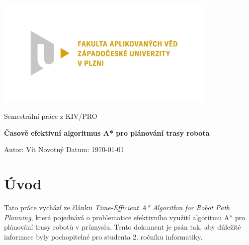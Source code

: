 \documentclass[10pt, a4paper]{article}
\begin{document}
\begin{titlepage}
    \includegraphics[width=0.80\textwidth]{images/fav.pdf}
    \begin{center}
        \vspace{2cm}

        \LARGE
        Semestrální práce z KIV/PRO

        \Huge
        \textbf{Časově efektivní algoritmus A* pro plánování trasy robota}

        \vspace{1cm}

        \vfill

        \vspace{0.5cm}

        \normalsize
        \raggedright
        Autor: Vít Novotný \hfill Datum: \today

        \vspace{0.2cm}

    \end{center}
\end{titlepage}

\thispagestyle{empty}
\pagebreak

\setcounter{page}{2}
\renewcommand{\cftsecleader}{\cftdotfill{\cftdotsep}}
\renewcommand{\cftsubsecleader}{\cftdotfill{\cftdotsep}}
\renewcommand{\cftsubsubsecleader}{\cftdotfill{\cftdotsep}}

\tableofcontents
\pagebreak


\section{Úvod}
Tato práce vychází ze článku \textit{Time-Efficient A* Algorithm for Robot Path Planning}\cite{MainWork}, která pojednává o problematice efektivního využití algoritmu A* pro plánování trasy robotů v průmyslu. Tento dokument je psán tak, aby důležité informace byly pochopitelné pro studenta 2. ročníku informatiky.
\end{document}
